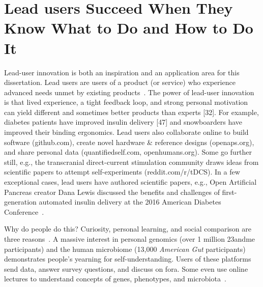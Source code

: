 \section{Lead users Succeed When They Know What to Do and How to Do It}


Lead-user innovation is both an inspiration and an application area for this dissertation. Lead users are
users of a product (or service) who experience advanced needs unmet by existing products~\cite{VonHippel2005}. The
power of lead-user innovation is that lived experience, a tight feedback loop, and strong personal
motivation can yield different and sometimes better products than experts [32]. For example, diabetes
patients have improved insulin delivery [47] and snowboarders have improved their binding
ergonomics. Lead users also collaborate online to build software
(github.com), create novel hardware \& reference designs
(openaps.org), and share personal data (quantifiedself.com,
openhumans.org). Some go further still, e.g., the transcranial
direct-current stimulation community draws ideas from scientific
papers to attempt self-experiments (reddit.com/r/tDCS). In a few exceptional cases, lead users have authored
scientific papers, e.g., Open Artificial Pancreas creator
Dana Lewis discussed the benefits and challenges of first-generation
automated insulin delivery at the 2016 American
Diabetes Conference~\cite{DanaLewis}.

Why do people do this? Curiosity, personal learning, and social
comparison are three reasons~\cite{Reinecke2015}. A massive interest in
personal genomics (over 1 million 23andme participants)
and the human microbiome (13,000 \textit{American
Gut} participants) demonstrates people’s yearning for self-understanding.
Users of these platforms send data, answer survey questions,
and discuss on fora. Some even use online lectures to understand
concepts of genes, phenotypes, and microbiota~\cite{23andMe2017, Knight2016}. 

